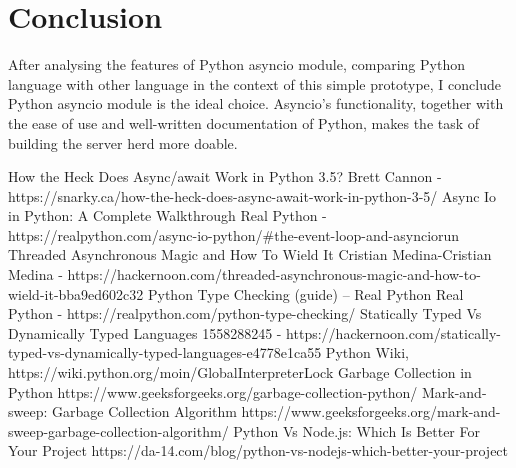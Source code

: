 \documentclass[letterpaper,twocolumn,10pt]{article}
\begin{document}
\section{Conclusion}
After analysing the features of Python asyncio module, comparing Python language with other language in the context of this simple prototype, I conclude Python asyncio module is the ideal choice. Asyncio's functionality, together with the ease of use and well-written documentation of Python, makes the task of building the server herd more doable.
\begin{thebibliography}{9}

\bibitem{}
How the Heck Does Async/await Work in Python 3.5?
Brett Cannon - https://snarky.ca/how-the-heck-does-async-await-work-in-python-3-5/
\bibitem{}
Async Io in Python: A Complete Walkthrough
Real Python - https://realpython.com/async-io-python/\#the-event-loop-and-asynciorun
\bibitem{}
Threaded Asynchronous Magic and How To Wield It
Cristian Medina-Cristian Medina - https://hackernoon.com/threaded-asynchronous-magic-and-how-to-wield-it-bba9ed602c32
\bibitem{}
Python Type Checking (guide) – Real Python
Real Python - https://realpython.com/python-type-checking/
\bibitem{}
Statically Typed Vs Dynamically Typed Languages
1558288245 - https://hackernoon.com/statically-typed-vs-dynamically-typed-languages-e4778e1ca55
\bibitem{}
Python Wiki,
https://wiki.python.org/moin/GlobalInterpreterLock
\bibitem{}
Garbage Collection in Python
https://www.geeksforgeeks.org/garbage-collection-python/
\bibitem{}
Mark-and-sweep: Garbage Collection Algorithm
https://www.geeksforgeeks.org/mark-and-sweep-garbage-collection-algorithm/
\bibitem{}
Python Vs Node.js: Which Is Better For Your Project
https://da-14.com/blog/python-vs-nodejs-which-better-your-project
\end{thebibliography}

\end{document}
